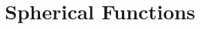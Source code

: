 \documentclass[Dissertation.tex]{subfiles}
\begin{document}
%
%


\section{Spherical Functions}
\label{sec:SphericalFunc}
%
\end{document}
